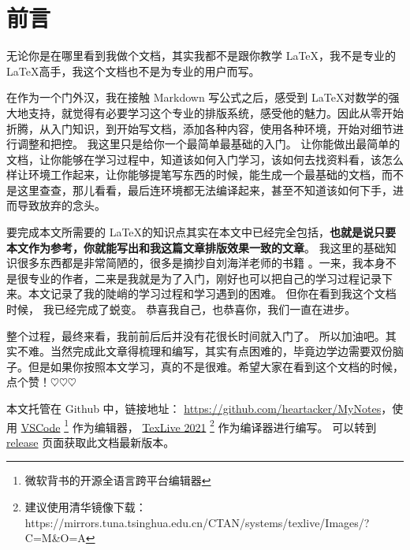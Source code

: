 \documentclass[UTF8,AutoFakeBold]{ctexart}
\numberwithin{figure}{section}
\numberwithin{table}{section}
\begin{document}
\clearpage

\section*{前言}

无论你是在哪里看到我做个文档，其实我都不是跟你教学 \LaTeX ，我不是专业的 \LaTeX 高手，我这个文档也不是为专业的用户而写。

在作为一个门外汉，我在接触 Markdown 写公式之后，感受到 \LaTeX 对数学的强大地支持，就觉得有必要学习这个专业的排版系统，感受他的魅力。因此从零开始折腾，从入门知识，到开始写文档，添加各种内容，使用各种环境，开始对细节进行调整和把控。 我这里只是给你一个最简单最基础的入门。 让你能做出最简单的文档，让你能够在学习过程中，知道该如何入门学习，该如何去找资料看，该怎么样让环境工作起来，让你能够提笔写东西的时候，能生成一个最基础的文档，而不是这里查查，那儿看看，最后连环境都无法编译起来，甚至不知道该如何下手，进而导致放弃的念头。

要完成本文所需要的 \LaTeX 的知识点其实在本文中已经完全包括，\textbf{也就是说只要本文作为参考，你就能写出和我这篇文章排版效果一致的文章}。 我这里的基础知识很多东西都是非常简陋的，很多是摘抄自刘海洋老师的书籍 \cite{latex_start}。一来，我本身不是很专业的作者，二来是我就是为了入门，刚好也可以把自己的学习过程记录下来。本文记录了我的陡峭的学习过程和学习遇到的困难。 但你在看到我这个文档时候， 我已经完成了蜕变。 恭喜我自己，也恭喜你，我们一直在进步。

整个过程，最终来看，我前前后后并没有花很长时间就入门了。 所以加油吧。其实不难。当然完成此文章得梳理和编写，其实有点困难的，毕竟边学边需要双份脑子。但是如果你按照本文学习，真的不是很难。希望大家在看到这个文档的时候，点个赞！$\heartsuit$$\heartsuit$$\heartsuit$

本文托管在 Github 中，链接地址： \href{https://github.com/heartacker/MyNotes}{https://github.com/heartacker/MyNotes}，使用 \href{https://code.visualstudio.com/}{VSCode} \footnote{微软背书的开源全语言跨平台编辑器} 作为编辑器， \href{https://tug.org/texlive/}{TexLive 2021} \footnote{建议使用清华镜像下载： https://mirrors.tuna.tsinghua.edu.cn/CTAN/systems/texlive/Images/?C=M\&O=A} 作为编译器进行编写。 可以转到 \href{https://github.com/heartacker/MyNotes/releases}{release} 页面获取此文档最新版本。

\clearpage


\begin{abstract}
    本文是记录在学习 \LaTeX 过程中遇到的问题和解决办法，并用 \LaTeX 写出来。 本文所涉及到的内容足够你完成和本文一样的输出效果。



\end{abstract}
\end{document}
